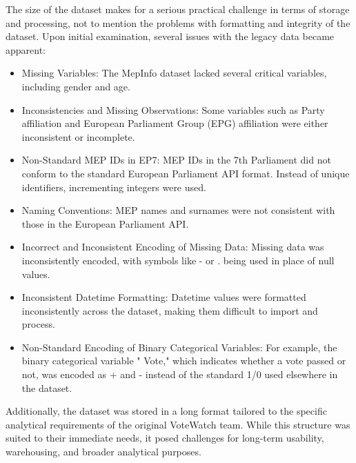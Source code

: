 \documentclass{report}
\begin{document}
            The size of the dataset makes for a serious practical challenge in terms of storage and processing, not to
            mention the problems with formatting and integrity of the dataset. Upon initial examination, several issues
            with the
            legacy data became apparent:

            \begin{itemize}
                \item
                Missing Variables: The MepInfo dataset lacked several critical variables, including gender and age.
                \item
                Inconsistencies and Missing Observations: Some variables such as Party affiliation and European
                Parliament Group
                (EPG) affiliation were either inconsistent or incomplete.
                \item
                Non-Standard MEP IDs in EP7: MEP IDs in the 7th Parliament did not conform to the standard European
                Parliament
                API format. Instead of unique identifiers, incrementing integers were used.
                \item
                Naming Conventions: MEP names and surnames were not consistent with those in the European
                Parliament API.
                \item
                Incorrect and Inconsistent Encoding of Missing Data: Missing data was inconsistently encoded, with
                symbols like
                - or . being used in place of null values.
                \item
                Inconsistent Datetime Formatting: Datetime values were formatted inconsistently across the dataset,
                making them
                difficult to import and process.
                \item
                Non-Standard Encoding of Binary Categorical Variables: For example, the binary categorical variable "
                Vote,"
                which indicates whether a vote passed or not, was encoded as + and - instead of the standard 1/0 used
                elsewhere
                in the dataset.
            \end{itemize}
            Additionally, the dataset was stored in a long format tailored to the specific analytical requirements of
            the
            original VoteWatch team. While this structure was suited to their immediate needs, it posed challenges for
            long-term
            usability, warehousing, and broader analytical purposes.
\end{document}
